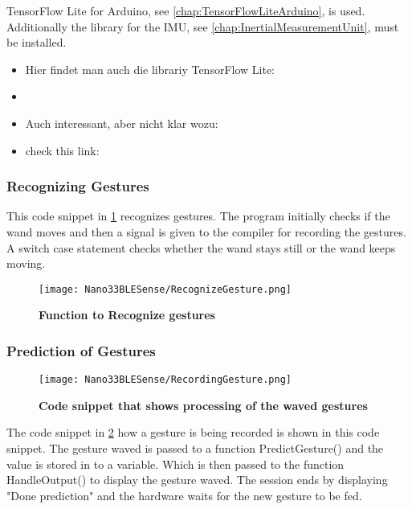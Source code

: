 TensorFlow Lite for Arduino, see \ref{chap:TensorFlowLiteArduino}, is used. Additionally the library for the IMU, see \ref{chap:InertialMeasurementUnit}, must be installed.




\begin{itemize}
  \item Hier findet man auch die librariy TensorFlow Lite: 
  \item {}
  \item Auch interessant, aber nicht klar wozu:
  \item check this link: 
\end{itemize}



\subsubsection{Recognizing Gestures}

This code snippet in \ref{fig:img13} recognizes gestures. The program initially checks if the wand moves and then a signal is given to the compiler for recording the gestures. A switch case statement checks whether the wand stays still or the wand keeps moving.

\begin{figure}[h!]
    \texttt{[image: Nano33BLESense/RecognizeGesture.png]}
    \caption{\textbf{Function to Recognize gestures}}
    \label{fig:img13}
\end{figure}

\subsubsection{Prediction of Gestures}

\begin{figure}[h!]
    \texttt{[image: Nano33BLESense/RecordingGesture.png]}
    \caption{\textbf{Code snippet that shows processing of the waved gestures}}
    \label{fig:img14}
\end{figure}

The code snippet in \ref{fig:img14} how a gesture is being recorded is shown in this code snippet. The gesture waved is passed to a function PredictGesture() and the value is stored in to a variable. Which is then passed to the function HandleOutput() to display the gesture waved. The session ends by displaying "Done prediction" and the hardware waits for the new gesture to be fed.

